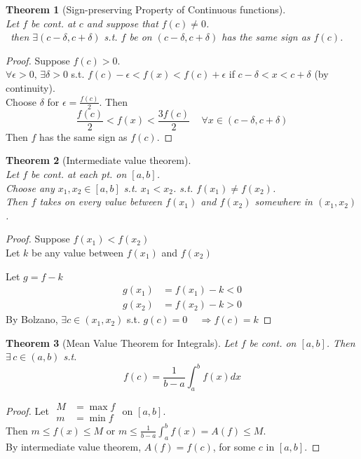 \documentclass[twoside]{amsart}
\theoremstyle{plain}
\newtheorem{theorem}{Theorem}
\theoremstyle{definition}
\begin{document}
\begin{theorem}[Sign-preserving Property of Continuous functions] \quad \\
Let $f$ be cont. at $c$ and suppose that $f(c) \neq 0$.  \\\
\quad \quad then $\exists (c-\delta, c+\delta)$ s.t. $f$ be on $(c-\delta, c+\delta)$ has the same sign as $f(c)$.  
\end{theorem}

\begin{proof}
  Suppose $f(c) >0$.   \\
  $\forall \epsilon > 0, \, \exists \delta > 0 $ s.t. $f(c) - \epsilon < f(x) < f(c) + \epsilon$ if $c-\delta < x < c+\delta$ (by continuity).  \\
  Choose $\delta$ for $\epsilon = \frac{f(c)}{2}$.  Then 
\[
\frac{f(c)}{2} < f(x) < \frac{3f(c)}{2} \quad \, \forall x \in (c-\delta, c+\delta)
\]
Then $f$ has the same sign as $f(c)$.  
\end{proof}

\begin{theorem}[Intermediate value theorem] \quad \\
Let $f$ be cont. at each pt. on $[a,b]$.  \\
Choose any $x_1, x_2 \in [a,b]$ s.t. $x_1 < x_2$.  s.t. $f(x_1) \neq f(x_2)$.  \\
Then $f$ takes on every value between $f(x_1)$ and $f(x_2)$ somewhere in $(x_1,x_2)$.  
\end{theorem}

\begin{proof}
  Suppose $f(x_1) < f(x_2)$  \\
  \phantom{ Suppose } Let $k$ be any value between $f(x_1)$ and $f(x_2)$ 

Let $g = f-k$ 
\[
\begin{aligned}
  g(x_1) & = f(x_1) - k < 0 \\
  g(x_2) & = f(x_2) - k > 0 
\end{aligned}
\]
By Bolzano, $\exists c \in (x_1,x_2)$ s.t. $g(c) = 0 \quad \, \Longrightarrow f(c) = k$
\end{proof}

\begin{theorem}[Mean Value Theorem for Integrals] Let $f$ be cont. on $[a,b]$.  Then $\exists \, c \in (a,b)$ s.t. 
\[
f(c) = \frac{1}{ b-a} \int_a^b f(x) dx
\]
\end{theorem}
\begin{proof} Let $\begin{aligned} M & = \max{f} \\ m & = \min{f} \end{aligned}$ on $[a,b]$.   \smallskip \\
Then $m \leq f(x) \leq M$ or $m\leq \frac{1}{b-a} \int_a^b f(x) = A(f) \leq M$.  \smallskip \\
By intermediate value theorem, $A(f) = f(c)$, for some $c$ in $[a,b]$. 
\end{proof}
\end{document}
